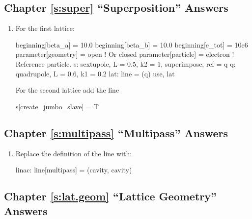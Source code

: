 \documentclass{hitec}     %
\begin{document}
\subsection[Chapter \ref*{s:super.ex} ``Superposition'']{Chapter \hyperref[s:super.ex]{\ref*{s:super}} ``Superposition'' Answers}
\label{s:ans.super}

\begin{enumerate}[label=\ref*{s:super}.\arabic{enumi}]
\item
For the first lattice:
\begin{code}
beginning[beta_a] = 10.0
beginning[beta_b] = 10.0
beginning[e_tot] = 10e6
parameter[geometry] = open          ! Or closed
parameter[particle] = electron      ! Reference particle.
s: sextupole, L = 0.5, k2 = 1, superimpose, ref = q
q: quadrupole, L = 0.6, k1 = 0.2
lat: line = (q)
use, lat
\end{code}
For the second lattice add the line
\begin{code}
s[create_jumbo_slave] = T
\end{code}
\end{enumerate}

\subsection[Chapter \ref*{s:multipass.ex} ``Multipass'']{Chapter \hyperref[s:multipass.ex]{\ref*{s:multipass}} ``Multipass'' Answers}
\label{s:ans.multi}

\begin{enumerate}[label=\ref*{s:multipass}.\arabic{enumi}]
\item
Replace the definition of the  line with:
\begin{code}
linac: line[multipass] = (cavity, cavity)
\end{code}
\end{enumerate}

\subsection[Chapter \ref*{s:lat.geom.ex} ``Lattice Geometry'']{Chapter \hyperref[s:lat.geom.ex]{\ref*{s:lat.geom}} ``Lattice Geometry'' Answers}
\label{s:ans.geom}
\end{document}
